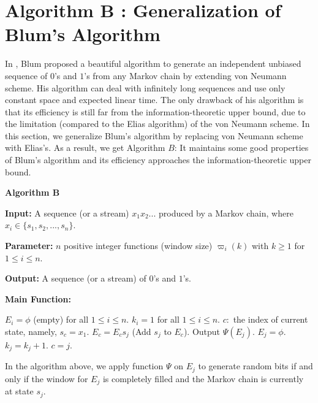 \documentclass[journal]{IEEEtran}
\begin{document}
\section{Algorithm B : Generalization of Blum's Algorithm}
\label{section_infinite}

In \cite{Blum1986}, Blum proposed a beautiful algorithm to generate an independent unbiased sequence of $0$'s and $1$'s from any Markov chain by extending von Neumann scheme.
His algorithm can deal with infinitely long sequences and use only constant space and expected linear time. The only drawback of his algorithm is that its efficiency is still far from
the information-theoretic upper bound, due to the limitation (compared to the
Elias algorithm) of the von Neumann scheme. In this section, we generalize Blum's algorithm by replacing von Neumann scheme with
Elias's. As a result, we get Algorithm $B$: It maintains some good properties of Blum's algorithm and its efficiency approaches the information-theoretic upper bound.

\begin{list}{}{\leftmargin=0.5em}
\renewcommand{\labelitemi}{}
  \item
  \item \textbf{Algorithm B}
  \item \textbf{Input:} A sequence (or a stream) $x_1x_2...$ produced by a Markov chain, where $x_i\in \{s_1,s_2,...,s_n\}$.
  \item \textbf{Parameter:} $n$ positive integer functions (window size) $\varpi_i(k)$ with $k\geq 1$ for $1\leq i\leq n$.
  \item \textbf{Output:} A sequence (or a stream) of $0$'s and $1$'s.
  \item \textbf{Main Function:}
\begin{algorithmic}
\STATE $E_i=\phi$ (empty) for all $1\leq i\leq n$.
\STATE $k_i=1$ for all $1\leq i\leq n$.
\STATE $c:$ the index of current state, namely, $s_c=x_1$.
\STATE $E_c=E_cs_j$ (Add $s_j$ to $E_{c}$).
\STATE Output $\Psi(E_j)$.
\STATE $E_j=\phi$.
\STATE $k_j=k_j+1$.
\ENDIF
\STATE $c=j$.
\ENDWHILE
\end{algorithmic}
\item
\end{list}


In the algorithm above, we apply function $\Psi$ on $E_j$ to generate
random bits if and only if the window for $E_j$ is completely filled and
the Markov chain is currently at state $s_j$.
\end{document}
